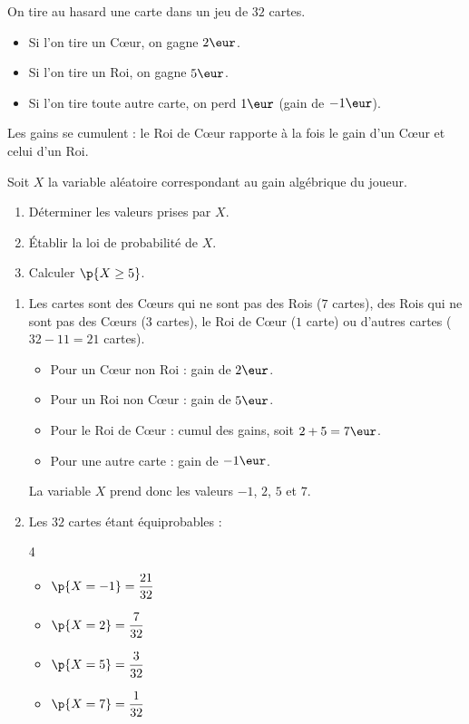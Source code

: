 \begin{methode}
	On tire au hasard une carte dans un jeu de $32$ cartes.
	\begin{itemize}
		\item Si l'on tire un Cœur, on gagne $2\eur$.
		\item Si l'on tire un Roi, on gagne $5\eur$.
		\item Si l'on tire toute autre carte, on perd $1\eur$ (gain de $-1\eur$).
	\end{itemize}

	Les gains se cumulent : le Roi de Cœur rapporte à la fois le gain d'un Cœur et celui d'un Roi.

	Soit $X$ la variable aléatoire correspondant au gain algébrique du joueur.

	\begin{enumerate}
		\item Déterminer les valeurs prises par $X$.
		\item Établir la loi de probabilité de $X$.
		\item Calculer $\p{X \geq 5}$.
	\end{enumerate}

	\newpage

	\begin{correction}
		\nline
		\begin{enumerate}
			\item Les cartes sont des Cœurs qui ne sont pas des Rois ($7$ cartes), des Rois qui ne sont pas des Cœurs ($3$ cartes), le Roi de Cœur ($1$ carte) ou d'autres cartes ($32 - 11 = 21$ cartes).
			      \begin{itemize}
				      \item Pour un Cœur non Roi : gain de $2\eur$.
				      \item Pour un Roi non Cœur : gain de $5\eur$.
				      \item Pour le Roi de Cœur : cumul des gains, soit $2 + 5 = 7\eur$.
				      \item Pour une autre carte : gain de $-1\eur$.
			      \end{itemize}
			      La variable $X$ prend donc les valeurs $-1$, $2$, $5$ et $7$.

			\item Les $32$ cartes étant équiprobables :
			      \begin{multicols}{4}
				      \begin{itemize}
					      \item $\p{X = -1} = \dfrac{21}{32}$
					      \item $\p{X = 2} = \dfrac{7}{32}$
					      \item $\p{X = 5} = \dfrac{3}{32}$
					      \item $\p{X = 7} = \dfrac{1}{32}$
				      \end{itemize}
			      \end{multicols}


\end{enumerate}
\end{correction}
\end{methode}
